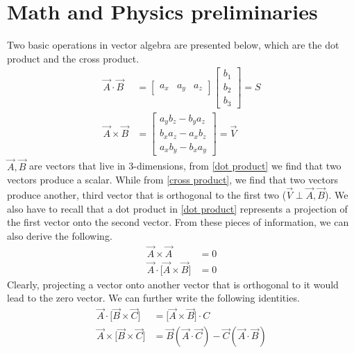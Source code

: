 \documentclass[a4paper, reqno, 12pt, openbib]{article} %
\begin{document}
\section{Math and Physics preliminaries} 
Two basic operations in vector algebra are presented below, which are the dot product and the cross product. 
\begin{align}
	\label{dot product}
	\vec{A} \cdot \vec{B} &= 
		\begin{bmatrix}
			a_{x} & a_{y} & a_{z}
		\end{bmatrix} 
		\begin{bmatrix}
			b_{1}\\
			b_{2}\\
			b_{3}
		\end{bmatrix} = S\\	
	\label{cross product}
	\vec{A} \times \vec{B} &= 
		\begin{bmatrix}
			a_{y}b_{z} - b_{y}a_{z}\\
			b_{x}a_{z} - a_{x}b_{z}\\
			a_{x}b_{y} - b_{x}a_{y}
		\end{bmatrix} = \vec{V} 
\end{align}	
$\vec{A}, \vec{B}$ are vectors that live in 3-dimensions, from \autoref{dot product} we find that two vectors produce a scalar. While from \autoref{cross product}, we find that two vectors produce another, third vector that is orthogonal to the first two ($\vec{V} \perp \vec{A}, \vec{B}$). We also have to recall that a dot product in \autoref{dot product} represents a projection of the first vector onto the second vector. From these pieces of information, we can also derive the following. 
\begin{align}
	\label{cross cross} 
	\vec{A} \times \vec{A} &= 0\\
	\label{dot cross}
	\vec{A} \cdot \Big[ \vec{A} \times \vec{B} \Big] &= 0
\end{align}
Clearly, projecting a vector onto another vector that is orthogonal to it would lead to the zero vector. We can further write the following identities. 
\begin{align}
	\vec{A} \cdot \Big[ \vec{B} \times \vec{C} \Big] &= \Big[\vec{A} \times \vec{B} \Big] \cdot C\\
	\vec{A} \times \Big[\vec{B} \times \vec{C} \Big] &= \vec{B}(\vec{A} \cdot \vec{C}) - \vec{C}(\vec{A} \cdot \vec{B})
\end{align} 
\end{document}
